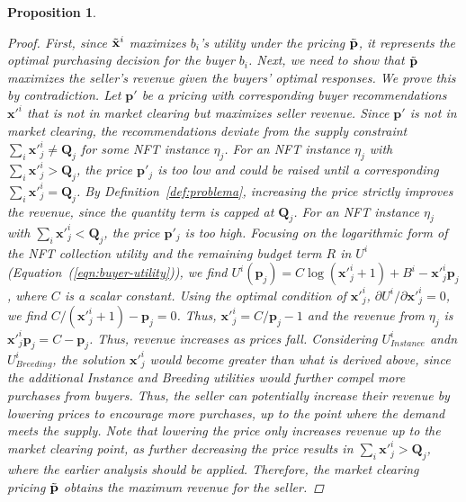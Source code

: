 \documentclass[conference]{IEEEtran}
\theoremstyle{plain}
\newtheorem{proposition}{Proposition}
\begin{document}
\begin{proposition}
{\begin{proof}
        First, since $\Tilde{\mathbf{x}}^i$ maximizes $b_i$’s utility under the pricing $\Tilde{\mathbf{p}}$, it represents the optimal purchasing decision for the buyer $b_i$. Next, we need to show that $\Tilde{\mathbf{p}}$ maximizes the seller's revenue given the buyers' optimal responses. We prove this by contradiction. Let $\mathbf{p}'$ be a pricing with corresponding buyer recommendations $\mathbf{x}'^{i}$ that is not in market clearing but maximizes seller revenue. Since $\mathbf{p}'$ is not in market clearing, the recommendations deviate from the supply constraint $\sum_i\mathbf{x}'^{i}_j \neq \mathbf{Q}_j$ for some NFT instance $\eta_j$. For an NFT instance $\eta_j$ with $\sum_i\mathbf{x}'^{i}_j > \mathbf{Q}_j$, the price $\mathbf{p}'_j$ is too low and could be raised until a corresponding $\sum_i\mathbf{x}'^{i}_j = \mathbf{Q}_j$. By Definition~\ref{def:problema}, increasing the price strictly improves the revenue, since the quantity term is capped at $\mathbf{Q}_j$. For an NFT instance $\eta_j$ with $\sum_i\mathbf{x}'^{i}_j < \mathbf{Q}_j$, the price $\mathbf{p}'_j$ is too high. Focusing on the logarithmic form of the NFT collection utility and the remaining budget term $R$ in $U^i$ (Equation~(\ref{eqn:buyer-utility})), we find $U^{i}(\mathbf{p}_j) = C\log(\mathbf{x}'^{i}_j+1) + B^i- \mathbf{x}'^{i}_j\mathbf{p}_j$, where $C$ is a scalar constant. Using the optimal condition of $\mathbf{x}'^{i}_j$, $\partial U^{i}/\partial \mathbf{x}'^{i}_j = 0$, we find $C/(\mathbf{x}'^{i}_j+1) - \mathbf{p}_j = 0$. Thus, $\mathbf{x}'^{i}_j = C/\mathbf{p}_j - 1$ and the revenue from $\eta_j$ is $\mathbf{x}'^{i}_j\mathbf{p}_j = C - \mathbf{p}_j$. Thus, revenue increases as prices fall. Considering $U^i_\textit{Instance}$ andn $U^i_\textit{Breeding}$, the solution $\mathbf{x}'^{i}_j$ would become greater than what is derived above, since the additional Instance and Breeding utilities would further compel more purchases from buyers. Thus, the seller can potentially increase their revenue by lowering prices to encourage more purchases, up to the point where the demand meets the supply. Note that lowering the price only increases revenue up to the market clearing point, as further decreasing the price results in $\sum_i\mathbf{x}'^{i}_j > \mathbf{Q}_j$, where the earlier analysis should be applied. Therefore, the market clearing pricing $\Tilde{\mathbf{p}}$ obtains the maximum revenue for the seller.
    \end{proof}
    }
\end{proposition}
\end{document}

